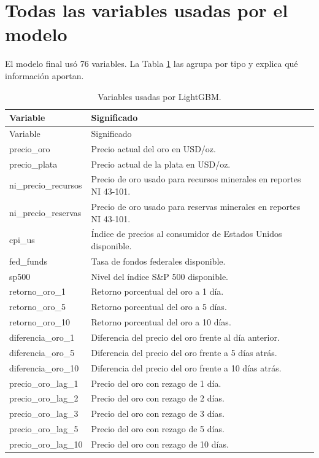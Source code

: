 \documentclass[12pt,letterpaper]{article}
\begin{document}
\section{Todas las variables usadas por el modelo}
El modelo final usó 76 variables. La Tabla \ref{tab:todasvariables} las agrupa por tipo y explica qué información aportan.

\begin{longtable}{p{4.2cm}p{10.2cm}}
\caption{Variables usadas por LightGBM.}\label{tab:todasvariables}\\
\toprule
Variable & Significado \\
\midrule
\endfirsthead
\toprule
Variable & Significado \\
\midrule
\endhead
precio\_oro & Precio actual del oro en USD/oz. \\
precio\_plata & Precio actual de la plata en USD/oz. \\
ni\_precio\_recursos & Precio de oro usado para recursos minerales en reportes NI 43-101. \\
ni\_precio\_reservas & Precio de oro usado para reservas minerales en reportes NI 43-101. \\
cpi\_us & Índice de precios al consumidor de Estados Unidos disponible. \\
fed\_funds & Tasa de fondos federales disponible. \\
sp500 & Nivel del índice S\&P 500 disponible. \\
retorno\_oro\_1 & Retorno porcentual del oro a 1 día. \\
retorno\_oro\_5 & Retorno porcentual del oro a 5 días. \\
retorno\_oro\_10 & Retorno porcentual del oro a 10 días. \\
diferencia\_oro\_1 & Diferencia del precio del oro frente al día anterior. \\
diferencia\_oro\_5 & Diferencia del precio del oro frente a 5 días atrás. \\
diferencia\_oro\_10 & Diferencia del precio del oro frente a 10 días atrás. \\
precio\_oro\_lag\_1 & Precio del oro con rezago de 1 día. \\
precio\_oro\_lag\_2 & Precio del oro con rezago de 2 días. \\
precio\_oro\_lag\_3 & Precio del oro con rezago de 3 días. \\
precio\_oro\_lag\_5 & Precio del oro con rezago de 5 días. \\
precio\_oro\_lag\_10 & Precio del oro con rezago de 10 días. \\

\end{longtable}
\end{document}
